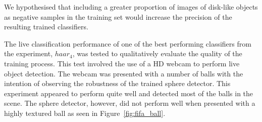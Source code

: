 \documentclass{sig-alternate-05-2015}
\begin{document}
{{		We hypothesised that including a greater proportion of images of disk-like objects as negative samples in the training set would increase the precision of the resulting trained classifiers.

		The live classification performance of one of the best performing classifiers from the experiment, \(haar_4\), was tested to qualitatively evaluate the quality of the training process.
		This test involved the use of a HD webcam to perform live object detection. The webcam was presented with a number of balls with the intention of observing the robustness of the trained sphere detector.
		This experiment appeared to perform quite well and detected most of the balls in the scene. The sphere detector, however, did not perform well when presented with a highly textured ball as seen in Figure~\ref{fig:fifa_ball}.

}}
\end{document}
